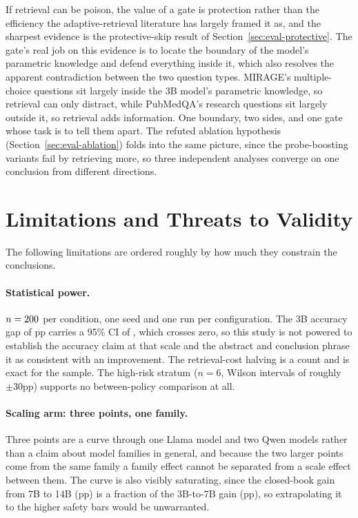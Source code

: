 If retrieval can be poison, the value of a gate is protection rather than the
efficiency the adaptive-retrieval literature has largely framed it as, and the
sharpest evidence is the protective-skip result of
Section~\ref{sec:eval-protective}. The gate's real job on this evidence is to
locate the boundary of the model's parametric knowledge and defend everything
inside it, which also resolves the apparent contradiction between the two
question types. MIRAGE's multiple-choice questions sit largely inside the 3B
model's parametric knowledge, so retrieval can only distract, while PubMedQA's
research questions sit largely outside it, so retrieval adds information. One
boundary, two sides, and one gate whose task is to tell them apart. The
refuted ablation hypothesis (Section~\ref{sec:eval-ablation}) folds into the
same picture, since the probe-boosting variants fail by retrieving more, so
three independent analyses converge on one conclusion from different
directions.

\section{Limitations and Threats to Validity}
\label{sec:disc-limitations}

The following limitations are ordered roughly by how much they constrain the
conclusions.

\paragraph{Statistical power.} $n=200{}$ per condition, one seed and
one run per configuration. The 3B accuracy gap of \diffPfivePone{}pp carries a
95\% CI of \diffPfivePoneCI{}, which crosses zero, so this study is not
powered to establish the accuracy claim at that scale and the abstract and
conclusion phrase it as consistent with an improvement. The retrieval-cost
halving is a count and is exact for the sample. The high-risk stratum ($n=6$,
Wilson intervals of roughly $\pm 30$pp) supports no between-policy comparison
at all.

\paragraph{Scaling arm: three points, one family.} Three points are a curve
through one Llama model and two Qwen models rather than a claim about model
families in general, and because the two larger points come from the same
family a family effect cannot be separated from a scale effect between them.
The curve is also visibly saturating, since the closed-book gain from 7B to
14B (\scaleGainLarge{}pp) is a fraction of the 3B-to-7B gain
(\scaleGainSmall{}pp), so extrapolating it to the higher safety bars would be
unwarranted.

